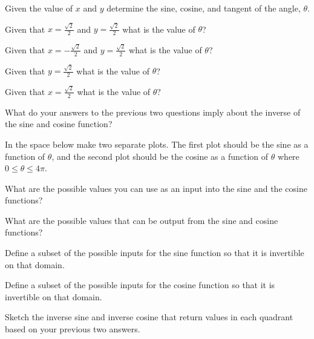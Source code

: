 \begin{problem}
  \begin{subproblem}
  \item Given the value of $x$ and $y$ determine the sine, cosine, and
    tangent of the angle, $\theta$.
    \vfill
  \item Given that $x=\frac{\sqrt{2}}{2}$ and $y=\frac{\sqrt{2}}{2}$
    what is the value of $\theta$?
    \vfill
  \item Given that $x=-\frac{\sqrt{2}}{2}$ and $y=\frac{\sqrt{2}}{2}$
    what is the value of $\theta$?
    \vfill
  \item Given that $y=\frac{\sqrt{2}}{2}$ what is the value of
    $\theta$?  
    \vfill
  \item Given that $x=\frac{\sqrt{2}}{2}$ what is the value of
    $\theta$?  
    \vfill
  \item What do your answers to the previous two questions imply about
    the inverse of the sine and cosine function?
    \vfill
  \end{subproblem}

  \clearpage

\item In the space below make two separate plots. The first plot
  should be the sine as a function of $\theta$, and the second plot
  should be the cosine as a function of $\theta$ where
  $0\leq\theta\leq 4\pi$.  


  \vfill

\item What are the possible values you can use as an input into the
  sine and the cosine functions?  
  \vspace{3em}

\item What are the possible values that can be output from the sine
  and cosine functions?
  \vspace{3em}

  \clearpage

\item Define a subset of the possible inputs for the sine function
  so that it is invertible on that domain.

  \vfill

\item Define a subset of the possible inputs for the cosine function
  so that it is invertible on that domain.

  \vfill

\item Sketch the inverse sine and inverse cosine that return values in
  each quadrant based on your previous two answers.

  \vfill

\end{problem}

